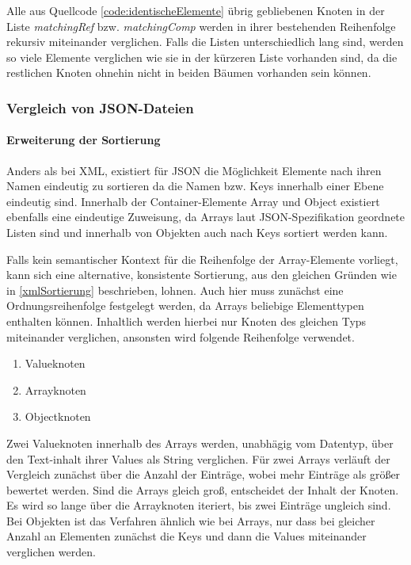 Alle aus Quellcode \ref{code:identischeElemente} übrig gebliebenen Knoten in der Liste \emph{matchingRef} bzw. \emph{matchingComp} werden in ihrer bestehenden Reihenfolge rekursiv miteinander verglichen. Falls die Listen unterschiedlich lang sind, werden so viele Elemente verglichen wie sie in der kürzeren Liste vorhanden sind, da die restlichen Knoten ohnehin nicht in beiden Bäumen vorhanden sein können.

\newpage\subsubsection{Vergleich von JSON-Dateien}

\paragraph{Erweiterung der Sortierung}\mbox{}

Anders als bei XML, existiert für JSON die Möglichkeit Elemente nach ihren Namen eindeutig zu sortieren da die Namen bzw. Keys innerhalb einer Ebene eindeutig sind. Innerhalb der Container-Elemente Array und Object existiert ebenfalls eine eindeutige Zuweisung, da Arrays laut JSON-Spezifikation geordnete Listen sind und innerhalb von Objekten auch nach Keys sortiert werden kann.

Falls kein semantischer Kontext für die Reihenfolge der Array-Elemente vorliegt, kann sich eine alternative, konsistente Sortierung, aus den gleichen Gründen wie in \ref{xmlSortierung} beschrieben, lohnen. Auch hier muss zunächst eine Ordnungsreihenfolge festgelegt werden, da Arrays beliebige Elementtypen enthalten können. Inhaltlich werden hierbei nur Knoten des gleichen Typs miteinander verglichen, ansonsten wird folgende Reihenfolge verwendet.

\begin{enumerate}
    \item Valueknoten
    \item Arrayknoten
    \item Objectknoten
\end{enumerate}

Zwei Valueknoten innerhalb des Arrays werden, unabhägig vom Datentyp, über den Text-inhalt ihrer Values als String verglichen.
Für zwei Arrays verläuft der Vergleich zunächst über die Anzahl der Einträge, wobei mehr Einträge als größer bewertet werden. Sind die Arrays gleich groß, entscheidet der Inhalt der Knoten. Es wird so lange über die Arrayknoten iteriert, bis zwei Einträge ungleich sind.
Bei Objekten ist das Verfahren ähnlich wie bei Arrays, nur dass bei gleicher Anzahl an Elementen zunächst die Keys und dann die Values miteinander verglichen werden.

